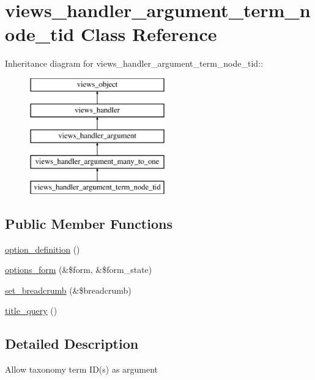\hypertarget{classviews__handler__argument__term__node__tid}{
\section{views\_\-handler\_\-argument\_\-term\_\-node\_\-tid Class Reference}
\label{classviews__handler__argument__term__node__tid}
}
Inheritance diagram for views\_\-handler\_\-argument\_\-term\_\-node\_\-tid::\begin{figure}[H]
\begin{center}
\leavevmode
\includegraphics[height=5cm]{classviews__handler__argument__term__node__tid}
\end{center}
\end{figure}
\subsection*{Public Member Functions}
\begin{CompactItemize}
\item 
\hyperlink{classviews__handler__argument__term__node__tid_aa442cbd37f901be13e6db17f61e8d02}{option\_\-definition} ()
\item 
\hyperlink{classviews__handler__argument__term__node__tid_f00552a1378333434154989c051d0e98}{options\_\-form} (\&\$form, \&\$form\_\-state)
\item 
\hyperlink{classviews__handler__argument__term__node__tid_ef9753aafd176e2e63c4a99be1177175}{set\_\-breadcrumb} (\&\$breadcrumb)
\item 
\hyperlink{classviews__handler__argument__term__node__tid_9f858ee5c343f6a14b87a320316710f0}{title\_\-query} ()
\end{CompactItemize}


\subsection{Detailed Description}
Allow taxonomy term ID(s) as argument 

